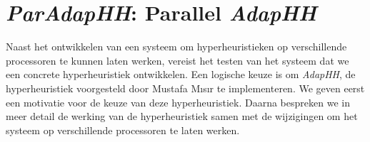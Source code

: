 \chapter{\emph{ParAdapHH}: Parallel \emph{AdapHH}}

Naast het ontwikkelen van een systeem om hyperheuristieken op verschillende processoren te kunnen laten werken, vereist het testen van het systeem dat we een concrete hyperheuristiek ontwikkelen. Een logische keuze is om \emph{AdapHH}, de hyperheuristiek voorgesteld door Mustafa M\i{}s\i{}r te implementeren. We geven eerst een motivatie voor de keuze van deze hyperheuristiek. Daarna bespreken we in meer detail de werking van de hyperheuristiek samen met de wijzigingen om het systeem op verschillende processoren te laten werken.

%











